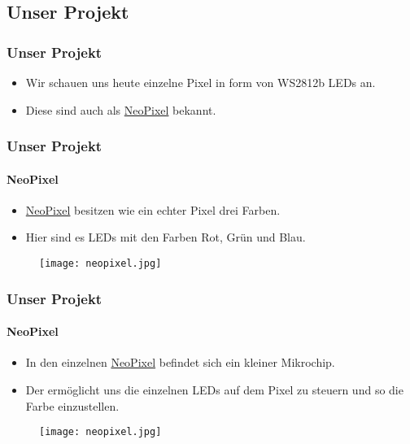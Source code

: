 \subsection{Unser Projekt}

\begin{frame}
    \frametitle{Unser Projekt}
    \begin{itemize}
        \item Wir schauen uns heute einzelne Pixel in form von WS2812b LEDs an.
        \item Diese sind auch als \href{https://en.wikipedia.org/wiki/Adafruit_Industries\#NeoPixel}{NeoPixel} bekannt.
    \end{itemize}
\end{frame}

\begin{frame}
    \frametitle{Unser Projekt}
    \framesubtitle{NeoPixel}
    \begin{minipage}{0.5\textwidth}
        \begin{itemize}
            \item \href{https://en.wikipedia.org/wiki/Adafruit_Industries\#NeoPixel}{NeoPixel} besitzen wie ein echter Pixel drei Farben.
            \item Hier sind es LEDs mit den Farben Rot, Grün und Blau.
        \end{itemize}
    \end{minipage} \hfill
    \begin{minipage}{0.45\textwidth}
        \begin{figure}
            \texttt{[image: neopixel.jpg]}
        \end{figure}
    \end{minipage}
\end{frame}

\begin{frame}
    \frametitle{Unser Projekt}
    \framesubtitle{NeoPixel}
    \begin{minipage}{0.5\textwidth}
        \begin{itemize}
            \item In den einzelnen \href{https://en.wikipedia.org/wiki/Adafruit_Industries\#NeoPixel}{NeoPixel} befindet sich ein kleiner Mikrochip.
            \item Der ermöglicht uns die einzelnen LEDs auf dem Pixel zu steuern und so die Farbe einzustellen.
        \end{itemize}
    \end{minipage} \hfill
    \begin{minipage}{0.45\textwidth}
        \begin{figure}
            \texttt{[image: neopixel.jpg]}
        \end{figure}
    \end{minipage}
\end{frame}

